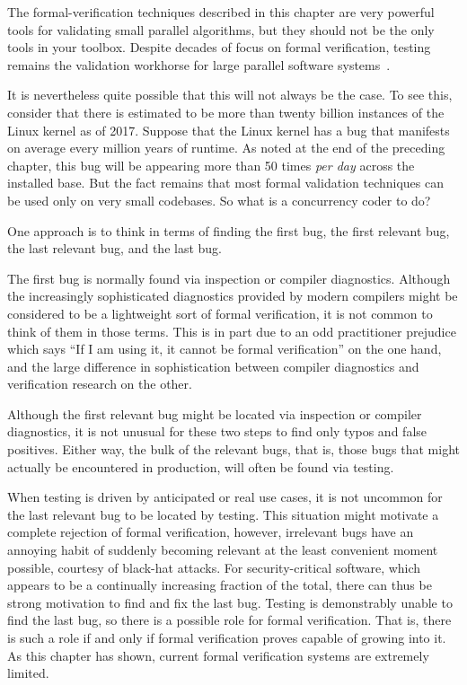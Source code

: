 The formal-verification techniques described in this chapter
are very powerful tools for validating small
parallel algorithms, but they should not be the only tools in your toolbox.
Despite decades of focus on formal verification, testing remains the
validation workhorse for large parallel software
systems~\cite{JonathanCorbet2006lockdep,DaveJones2011Trinity,PaulEMcKenney2016Formal}.

It is nevertheless quite possible that this will not always be the case.
To see this, consider that there is estimated to be more than twenty
billion instances of the Linux kernel as of 2017.
Suppose that the Linux kernel has a bug that manifests on average every million
years of runtime.
As noted at the end of the preceding chapter, this bug will be appearing
more than 50 times \emph{per day} across the installed base.
But the fact remains that most formal validation techniques can be used
only on very small codebases.
So what is a concurrency coder to do?

One approach is to think in terms of finding the first bug, the first
relevant bug, the last relevant bug, and the last bug.

The first bug is normally found via inspection or compiler diagnostics.
Although the increasingly sophisticated diagnostics provided by modern
compilers might be considered to be a lightweight sort of formal
verification, it is not common to think of them in those terms.
This is in part due to an odd practitioner prejudice which says
``If I am using it, it cannot be formal verification'' on the one
hand, and the large difference in sophistication between compiler
diagnostics and verification research on the other.

Although the first relevant bug might be located via inspection or
compiler diagnostics, it is not unusual for these two steps to find
only typos and false positives.
Either way, the bulk of the relevant bugs, that is, those bugs that
might actually be encountered in production, will often be found via testing.

When testing is driven by anticipated or real use cases, it is not
uncommon for the last relevant bug to be located by testing.
This situation might motivate a complete rejection of formal verification,
however, irrelevant bugs have an annoying habit of suddenly becoming relevant
at the least convenient moment possible, courtesy of black-hat attacks.
For security-critical software, which appears to be a continually
increasing fraction of the total, there can thus be strong motivation
to find and fix the last bug.
Testing is demonstrably unable to find the last bug, so there is a
possible role for formal verification.
That is, there is such a role if and only if formal verification
proves capable of growing into it.
As this chapter has shown, current formal verification systems are
extremely limited.

